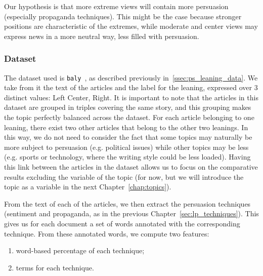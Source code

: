 

Our hypothesis is that more extreme views will contain more persuasion (especially propaganda techniques). This might be the case because stronger positions are characteristic of the extremes, while moderate and center views may express news in a more neutral way, less filled with persuasion.

\subsubsection{Dataset}
The dataset used is \texttt{baly}~\citep{baly2020we}, as described previously in~\ref{ssec:ps_leaning_data}.
We take from it the text of the articles and the label for the leaning, expressed over 3 distinct values: Left Center, Right.
It is important to note that the articles in this dataset are grouped in triples covering the same story, and this grouping makes the topic perfectly balanced across the dataset. For each article belonging to one leaning, there exist two other articles that belong to the other two leanings.
In this way, we do not need to consider the fact that some topics may naturally be more subject to persuasion (e.g. political issues) while other topics may be less (e.g. sports or technology, where the writing style could be less loaded).
Having this link between the articles in the dataset allows us to focus on the comparative results excluding the variable of the topic (for now, but we will introduce the topic as a variable in the next Chapter~\ref{chap:topics}).

From the text of each of the articles, we then extract the persuasion techniques (sentiment and propaganda, as in the previous Chapter~\ref{sec:lp_techniques}). This gives us for each document a set of words annotated with the corresponding technique. From these annotated words, we compute two features:
\begin{enumerate}
    \item word-based percentage of each technique;
    \item terms for each technique.
\end{enumerate}


